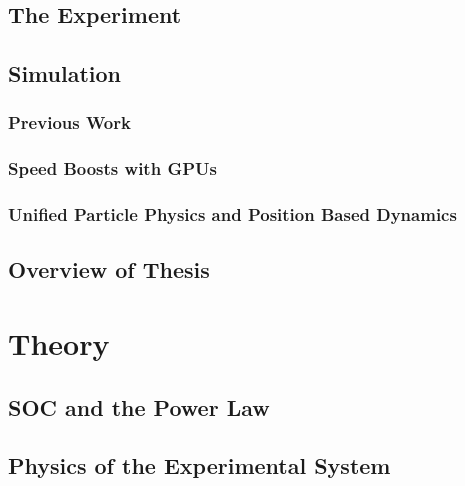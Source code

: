\documentclass{book}
\begin{document}


\section{The Experiment}

\section{Simulation}
\subsection{Previous Work}
\subsection{Speed Boosts with GPUs}
\subsection{Unified Particle Physics and Position Based Dynamics}


\section{Overview of Thesis}


\chapter{Theory}

\section{SOC and the Power Law}
\section{Physics of the Experimental System}
\end{document}
